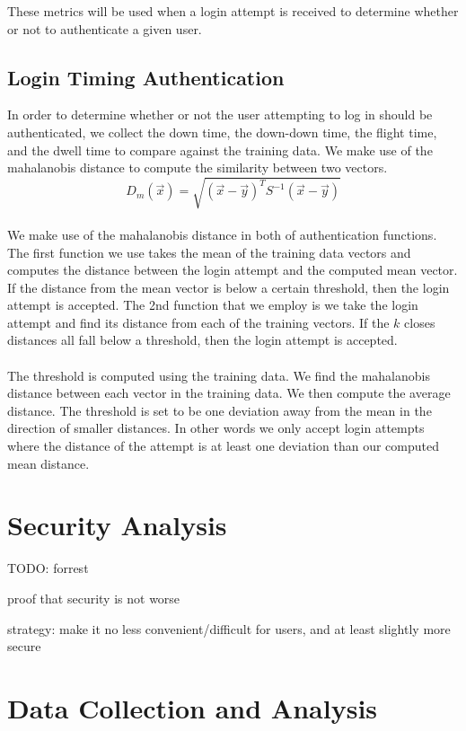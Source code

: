 \documentclass{article}
\begin{document}
These metrics will be used when a login attempt is received to determine whether or not to authenticate a given user.

\subsection{Login Timing Authentication}
In order to determine whether or not the user attempting to log in should be authenticated, we collect the down time, the down-down time, the flight time, and the dwell time to compare against the training data. We make use of the mahalanobis distance to compute the similarity between two vectors.  \\
\begin{displaymath}
D_m(\vec{x}) = \sqrt{(\vec{x}-\vec{y})^T S^{-1} (\vec{x}-\vec{y})}
\end{displaymath} \\
We make use of the mahalanobis distance in both of authentication functions. The first function we use takes the mean of the training data vectors and computes the distance between the login attempt and the computed mean vector. If the distance from the mean vector is below a certain threshold, then the login attempt is accepted. The 2nd function that we employ is we take the login attempt and find its distance from each of the training vectors. If the $k$ closes distances all fall below a threshold, then the login attempt is accepted. \\ \\
The threshold is computed using the training data. We find the mahalanobis distance between each vector in the training data. We then compute the average distance. The threshold is set to be one deviation away from the mean in the direction of smaller distances. In other words we only accept login attempts where the distance of the attempt is at least one deviation than our computed mean distance. 
\section{Security Analysis}
TODO: forrest

proof that security is not worse

strategy: make it no less convenient/difficult for users, and at least slightly more secure

\section{Data Collection and Analysis}
\end{document}
